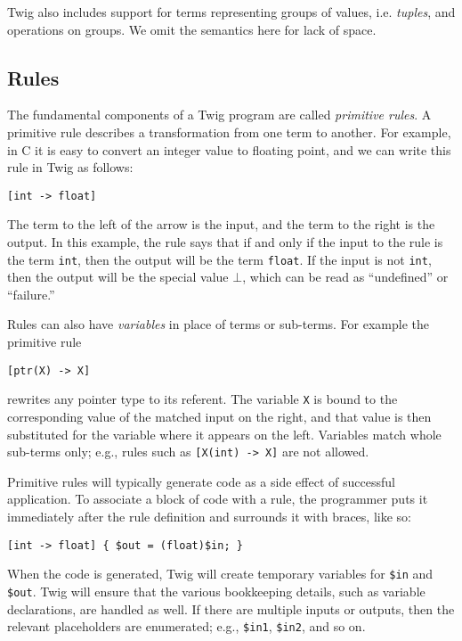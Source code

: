 Twig also includes support for terms representing groups of values, i.e. \emph{tuples}, and operations on groups. We omit the semantics here for lack of space.

\subsection{Rules}
\label{sec:rules}

The fundamental components of a Twig program are called \emph{primitive rules}. A primitive rule describes a transformation from one term to another. For example, in C it is easy to convert an integer value to floating point, and we can write this rule in Twig as follows:

\begin{verbatim}
[int -> float]
\end{verbatim}

The term to the left of the arrow is the input, and the term to the right is the output. In this example, the rule says that if and only if the input to the rule is the term \texttt{int}, then the output will be the term \texttt{float}. If the input is not \texttt{int}, then the output will be the special value $\bot$, which can be read as ``undefined'' or ``failure.''

Rules can also have \emph{variables} in place of terms or sub-terms. For example the primitive rule

\begin{verbatim}
[ptr(X) -> X]
\end{verbatim}

rewrites any pointer type to its referent. The variable \texttt{X} is bound to the corresponding value of the matched input on the right, and that value is then substituted for the variable where it appears on the left. Variables match whole sub-terms only; e.g., rules such as \texttt{[X(int) -> X]} are not allowed.

Primitive rules will typically generate code as a side effect of successful application. To associate a block of code with a rule, the programmer puts it immediately after the rule definition and surrounds it with braces, like so:

\begin{verbatim}
[int -> float] { $out = (float)$in; }
\end{verbatim}

When the code is generated, Twig will create temporary variables for \texttt{\$in} and \texttt{\$out}. Twig will ensure that the various bookkeeping details, such as variable declarations, are handled as well. If there are multiple inputs or outputs, then the relevant placeholders are enumerated; e.g., \texttt{\$in1}, \texttt{\$in2}, and so on.


